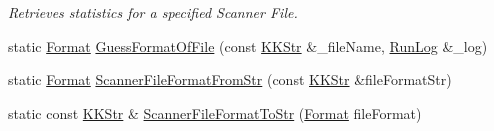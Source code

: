 \begin{DoxyCompactItemize}
\begin{DoxyCompactList}\small\item\em Retrieves statistics for a specified Scanner File. \end{DoxyCompactList}\item 
static \hyperlink{class_k_k_l_s_c_1_1_scanner_file_a9eb976c9d084a94db71a5e8d1fadb903}{Format} \hyperlink{class_k_k_l_s_c_1_1_scanner_file_a45e82ab4379bd25600c1ffc184f652a4}{Guess\+Format\+Of\+File} (const \hyperlink{class_k_k_b_1_1_k_k_str}{K\+K\+Str} \&\+\_\+file\+Name, \hyperlink{class_k_k_b_1_1_run_log}{Run\+Log} \&\+\_\+log)
\item 
static \hyperlink{class_k_k_l_s_c_1_1_scanner_file_a9eb976c9d084a94db71a5e8d1fadb903}{Format} \hyperlink{class_k_k_l_s_c_1_1_scanner_file_ab2862dee3312d4c8a16b1c6c5162ebff}{Scanner\+File\+Format\+From\+Str} (const \hyperlink{class_k_k_b_1_1_k_k_str}{K\+K\+Str} \&file\+Format\+Str)
\item 
static const \hyperlink{class_k_k_b_1_1_k_k_str}{K\+K\+Str} \& \hyperlink{class_k_k_l_s_c_1_1_scanner_file_a4d5ce02d320ee2f5efe5352651abae0d}{Scanner\+File\+Format\+To\+Str} (\hyperlink{class_k_k_l_s_c_1_1_scanner_file_a9eb976c9d084a94db71a5e8d1fadb903}{Format} file\+Format)
\end{DoxyCompactItemize}
